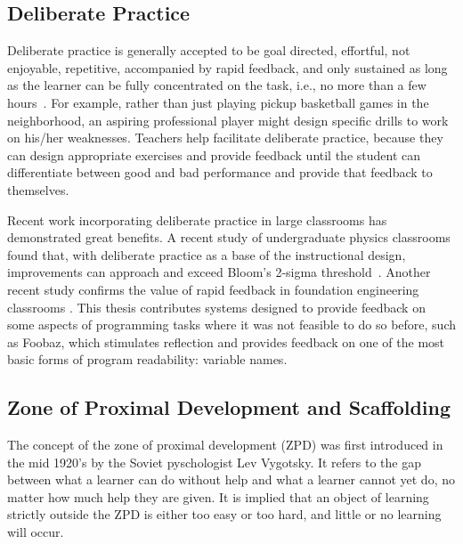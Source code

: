 
\subsection{Deliberate Practice}


Deliberate practice is generally accepted to be goal directed, effortful, not enjoyable, repetitive, accompanied by rapid feedback, and only sustained as long as the learner can be fully concentrated on the task, i.e., no more than a few hours~\cite{Gobet2012}. For example, rather than just playing pickup basketball games in the neighborhood, an aspiring professional player might design specific drills to work on his/her weaknesses. Teachers help facilitate deliberate practice, because they can design appropriate exercises and provide feedback until the student can differentiate between good and bad performance and provide that feedback to themselves.

Recent work incorporating deliberate practice in large classrooms has demonstrated great benefits. A recent study of undergraduate physics classrooms found that, with deliberate practice as a base of the instructional design, improvements can approach and exceed Bloom's 2-sigma threshold~\cite{Deslauriers862}. Another recent study confirms the value of rapid feedback in foundation engineering classrooms \cite{ieeeRapidFeedback}. This thesis contributes systems designed to provide feedback on some aspects of programming tasks where it was not feasible to do so before, such as Foobaz, which stimulates reflection and provides feedback on one of the most basic forms of program readability: variable names.

\subsection{Zone of Proximal Development and Scaffolding}

The concept of the zone of proximal development (ZPD) was first introduced in the mid 1920's by the Soviet pyschologist Lev Vygotsky. It refers to the gap between what a learner can do without help and what a learner cannot yet do, no matter how much help they are given. It is implied that an object of learning strictly outside the ZPD is either too easy or too hard, and little or no learning will occur.

